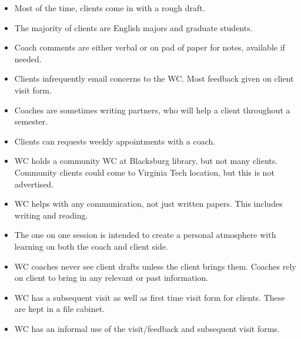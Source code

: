 \documentclass[12pt]{article} %
\begin{document}
\begin{itemize}
    \item Most of the time, clients come in with a rough draft.
    \item The majority of clients are English majors and graduate students.
    \item Coach comments are either verbal or on pad of paper for notes, available if needed.
    \item Clients infrequently email concerns to the WC.  Most feedback given on client visit form.
    \item Coaches are sometimes writing partners, who will help a client throughout a semester.
    \item Clients can requests weekly appointments with a coach.
    \item WC holds a community WC at Blacksburg library, but not many clients.  Community clients could come to Virginia Tech location, but this is not advertised. 
    \item WC helps with any communication, not just written papers.  This includes writing and reading.
    \item The one on one session is intended to create a personal atmosphere with learning on both the coach and client side.
    \item WC coaches never see client drafts unless the client brings them.  Coaches rely on client to bring in any relevant or past information.
    \item WC has a subsequent visit as well as first time visit form for clients.  These are kept in a file cabinet.
    \item WC has an informal use of the visit/feedback and subsequent visit forms.
  \end{itemize}
  
\end{document}
